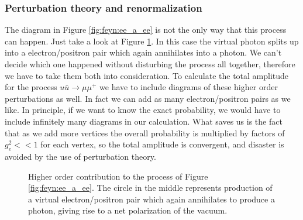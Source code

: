 \subsubsection{Perturbation theory and renormalization}
The diagram in Figure \ref{fig:feyn:ee_a_ee} is not the only way that this process can happen. Just take a look at Figure \ref{fig:feyn:ee_a_ee_2}. In this case the virtual photon splits up into a electron/positron pair which again annihilates into a photon. We can't decide which one happened without disturbing the process all together, therefore we have to take them both into consideration. To calculate the total amplitude for the process $u \bar u \rightarrow \mu \mu^+$ we have to include diagrams of these higher order perturbations as well. In fact we can add as many electron/positron pairs as we like. In principle, if we want to know the exact probability, we would have to include infinitely many diagrams in our calculation. What saves us is the fact that as we add more vertices the overall probability is multiplied by factors of $g_e^2 << 1$ for each vertex, so the total amplitude is convergent, and disaster is avoided by the use of perturbation theory.

\begin{figure}[htp]
\centering
	
\caption{Higher order contribution to the process of Figure \ref{fig:feyn:ee_a_ee}. The circle in the middle represents production of a virtual electron/positron pair which again annihilates to produce a photon, giving rise to a net polarization of the vacuum.} \label{fig:feyn:ee_a_ee_2}
\end{figure}

